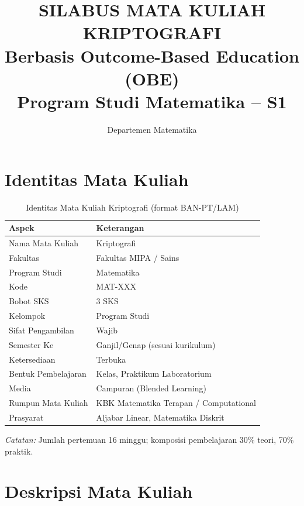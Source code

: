 \documentclass[12pt,a4paper]{article}
\title{\textbf{SILABUS MATA KULIAH KRIPTOGRAFI}\\
\large Berbasis Outcome-Based Education (OBE)\\
Program Studi Matematika -- S1}
\author{Departemen Matematika}
\date{}
\begin{document}
\maketitle
\thispagestyle{empty}
\newpage

\tableofcontents
\newpage

\section{Identitas Mata Kuliah}

\begin{table}[!htbp]
\centering
\small
\begin{tabular}{|l|l|}
\hline
\textbf{Aspek} & \textbf{Keterangan} \\
\hline
Nama Mata Kuliah & Kriptografi \\
Fakultas & Fakultas MIPA / Sains \\
Program Studi & Matematika \\
Kode & MAT-XXX \\
Bobot SKS & 3 SKS \\
Kelompok & Program Studi \\
Sifat Pengambilan & Wajib \\
Semester Ke & Ganjil/Genap (sesuai kurikulum) \\
Ketersediaan & Terbuka \\
Bentuk Pembelajaran & Kelas, Praktikum Laboratorium \\
Media & Campuran (Blended Learning) \\
Rumpun Mata Kuliah & KBK Matematika Terapan / Computational \\
Prasyarat & Aljabar Linear, Matematika Diskrit \\
\hline
\end{tabular}
\caption{Identitas Mata Kuliah Kriptografi (format BAN-PT/LAM)}
\end{table}

\textit{Catatan:} Jumlah pertemuan 16 minggu; komposisi pembelajaran 30\% teori, 70\% praktik.

\section{Deskripsi Mata Kuliah}
\end{document}
